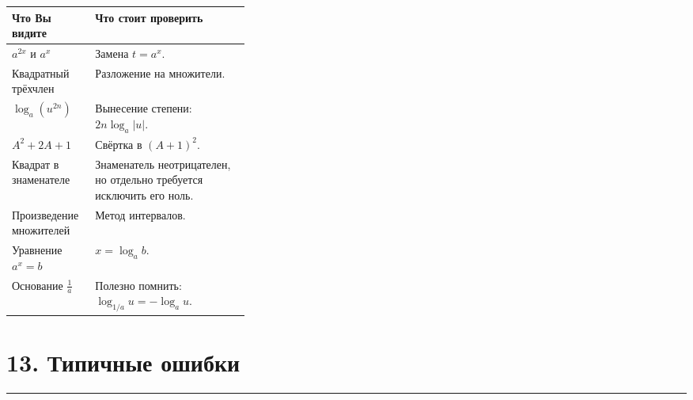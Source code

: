 \documentclass[a4paper,12pt]{article}
\newcommand{\topicline}{%
  \par\noindent
  {\color{accent!55}\rule{\linewidth}{0.6pt}}
  \par
}
\begin{document}
\begin{tabularx}{\linewidth}{@{}p{0.35\linewidth}X@{}}
\toprule
\textbf{Что Вы видите} & \textbf{Что стоит проверить} \\
\midrule
\(a^{2x}\) и \(a^x\) &
Замена \(t=a^x\). \\[1mm]

Квадратный трёхчлен &
Разложение на множители. \\[1mm]

\(\log_a(u^{2n})\) &
Вынесение степени:
\(2n\log_a|u|\). \\[1mm]

\(A^2+2A+1\) &
Свёртка в \((A+1)^2\). \\[1mm]

Квадрат в знаменателе &
Знаменатель неотрицателен, но отдельно требуется исключить его ноль. \\[1mm]

Произведение множителей &
Метод интервалов. \\[1mm]

Уравнение \(a^x=b\) &
\(x=\log_a b\). \\[1mm]

Основание \(\frac1a\) &
Полезно помнить:
\(\log_{1/a}u=-\log_a u\). \\
\bottomrule
\end{tabularx}

\section*{\color{darkaccent}13. Типичные ошибки}
\topicline
\end{document}
